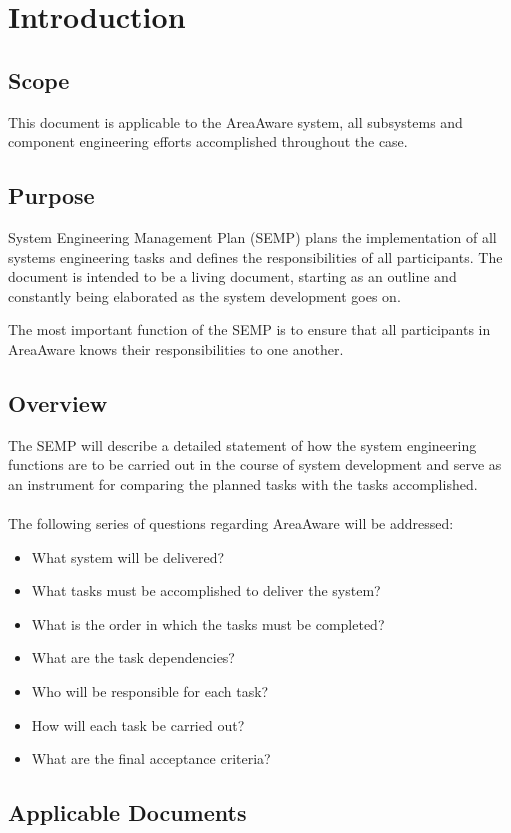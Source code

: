 %
\thispagestyle{fancy}
\chapter{Introduction}
\label{chp:intro}


\section{Scope}
This document is applicable to the AreaAware system, all subsystems and component engineering efforts accomplished throughout the case.

\section{Purpose}
System Engineering Management Plan (SEMP) plans the implementation of all systems engineering tasks and defines the responsibilities of all participants.
The document is intended to be a living document, starting as an outline and constantly being elaborated as the system development goes on.

The most important function of the SEMP is to ensure that all participants in AreaAware knows their responsibilities to one another. \\

\section{Overview}
The SEMP will describe a detailed statement of how the system engineering functions are to be carried out in the course of system development and serve as an instrument for comparing the planned tasks with the tasks accomplished.\\\\
The following series of questions regarding AreaAware will be addressed:
\begin{itemize}
    \item What system will be delivered?
    \item What tasks must be accomplished to deliver the system?
    \item What is the order in which the tasks must be completed?
    \item What are the task dependencies?
    \item Who will be responsible for each task?
    \item How will each task be carried out?
    \item What are the final acceptance criteria?
\end{itemize}

\section{Applicable Documents}
